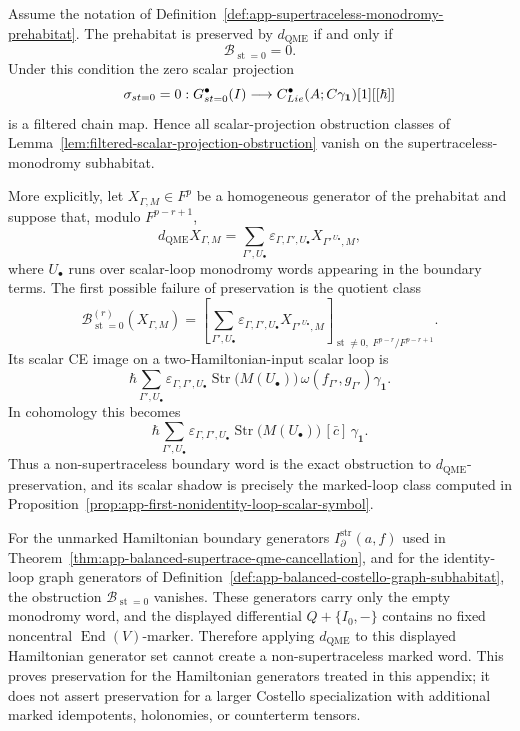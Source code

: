 \begin{thm}
\label{thm:app-supertraceless-monodromy-projection}
  Assume the notation of
  Definition~\ref{def:app-supertraceless-monodromy-prehabitat}.  The
  prehabitat is preserved by \(d_{\mathrm{QME}}\) if and only if
  \[
    \mathcal B_{\operatorname{st}=0}=0 .
  \]
  Under this condition the zero scalar projection
  \[
    \sigma_{st=0}=0:
    G^\bullet_{st=0}(I)
      \longrightarrow
    C^\bullet_{Lie}(A;C\gamma_{\mathbf 1})[1][[\hbar]]
  \]
  is a filtered chain map.  Hence all scalar-projection obstruction
  classes of Lemma~\ref{lem:filtered-scalar-projection-obstruction}
  vanish on the supertraceless-monodromy subhabitat.

  More explicitly, let \(X_{\Gamma,M}\in F^p\) be a homogeneous
  generator of the prehabitat and suppose that, modulo \(F^{p-r+1}\),
  \[
    d_{\mathrm{QME}}X_{\Gamma,M}
      =
    \sum_{\Gamma',U_\bullet}
      \varepsilon_{\Gamma,\Gamma',U_\bullet}
      X_{\Gamma'^{\,U_\bullet},M},
  \]
  where \(U_\bullet\) runs over scalar-loop monodromy words appearing in
  the boundary terms.  The first possible failure of preservation is the
  quotient class
  \[
    \mathcal B^{(r)}_{\operatorname{st}=0}(X_{\Gamma,M})
      =
    \left[
      \sum_{\Gamma',U_\bullet}
      \varepsilon_{\Gamma,\Gamma',U_\bullet}
      X_{\Gamma'^{\,U_\bullet},M}
    \right]_{\operatorname{st}\neq0,\;F^{p-r}/F^{p-r+1}} .
  \]
  Its scalar CE image on a two-Hamiltonian-input scalar loop is
  \[
    \hbar
    \sum_{\Gamma',U_\bullet}
      \varepsilon_{\Gamma,\Gamma',U_\bullet}
      \operatorname{Str}\!\bigl(M(U_\bullet)\bigr)\,
      \omega(f_{\Gamma'},g_{\Gamma'})\gamma_{\mathbf 1}.
  \]
  In cohomology this becomes
  \[
    \hbar
    \sum_{\Gamma',U_\bullet}
      \varepsilon_{\Gamma,\Gamma',U_\bullet}
      \operatorname{Str}\!\bigl(M(U_\bullet)\bigr)\,
      [\bar c]\,\gamma_{\mathbf 1}.
  \]
  Thus a non-supertraceless boundary word is the exact obstruction to
  \(d_{\mathrm{QME}}\)-preservation, and its scalar shadow is precisely
  the marked-loop class computed in
  Proposition~\ref{prop:app-first-nonidentity-loop-scalar-symbol}.

  For the unmarked Hamiltonian boundary generators
  \(I^{\operatorname{str}}_\partial(a,f)\) used in
  Theorem~\ref{thm:app-balanced-supertrace-qme-cancellation}, and for the
  identity-loop graph generators of
  Definition~\ref{def:app-balanced-costello-graph-subhabitat}, the
  obstruction \(\mathcal B_{\operatorname{st}=0}\) vanishes.  These
  generators carry only the empty monodromy word, and the displayed
  differential \(Q+\{I_0,-\}\) contains no fixed noncentral
  \(\operatorname{End}(V)\)-marker.  Therefore applying
  \(d_{\mathrm{QME}}\) to this displayed Hamiltonian generator set cannot
  create a non-supertraceless marked word.  This proves preservation for
  the Hamiltonian generators treated in this appendix; it does not assert
  preservation for a larger Costello specialization with additional
  marked idempotents, holonomies, or counterterm tensors.
\end{thm}

